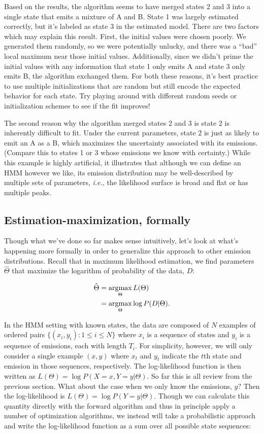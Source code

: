 Based on the results, the algorithm seems to have merged states 2 and 3 into a single state that emits a mixture of A and B. State 1 was largely estimated correctly, but it's labeled as state 3 in the estimated model. There are two factors which may explain this result. First, the initial values were chosen poorly. We generated them randomly, so we were potentially unlucky, and there was a ``bad'' local maximum near those initial values. Additionally, since we didn't prime the initial values with any information that state 1 only emits A and state 3 only emits B, the algorithm exchanged them. For both these reasons, it's best practice to use multiple initializations that are random but still encode the expected behavior for each state. Try playing around with different random seeds or initialization schemes to see if the fit improves!

The second reason why the algorithm merged states 2 and 3 is state 2 is inherently difficult to fit. Under the current parameters, state 2 is just as likely to emit an A as a B, which maximizes the uncertainty associated with its emissions. (Compare this to states 1 or 3 whose emissions we know with certainty.) While this example is highly artificial, it illustrates that although we can define an HMM however we like, its emission distribution may be well-described by multiple sets of parameters, \textit{i.e.}, the likelihood surface is broad and flat or has multiple peaks.

\subsection{Estimation-maximization, formally}

Though what we've done so far makes sense intuitively, let's look at what's happening more formally in order to generalize this approach to other emission distributions. Recall that in maximum likelihood estimation, we find parameters $\hat{\Theta}$ that maximize the logarithm of probability of the data, $D$:

\begin{align*}
\hat{\Theta}
&= \operatorname*{arg\!\max}_\Theta L(\Theta) \\
&= \operatorname*{arg\!\max}_\Theta \log P(D|\Theta). \\
\end{align*}

In the HMM setting with known states, the data are composed of $N$ examples of ordered pairs $\{(x_i, y_i): 1 \le i \le N\}$ where $x_i$ is a sequence of states and $y_i$ is a sequence of emissions, each with length $T_i$. For simplicity, however, we will only consider a single example $(x, y)$ where $x_t$ and $y_t$ indicate the $t$th state and emission in those sequences, respectively. The log-likelihood function is then written as $L(\Theta) = \log P(X=x, Y=y|\Theta)$. So far this is all review from the previous section. What about the case when we only know the emissions, $y$? Then the log-likelihood is $L(\Theta) = \log P(Y=y|\Theta)$. Though we can calculate this quantity directly with the forward algorithm and thus in principle apply a number of optimization algorithms, we instead will take a probabilistic approach and write the log-likelihood function as a sum over all possible state sequences:

